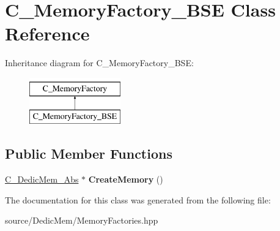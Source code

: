 \hypertarget{class_c___memory_factory___b_s_e}{\section{C\-\_\-\-Memory\-Factory\-\_\-\-B\-S\-E Class Reference}
\label{class_c___memory_factory___b_s_e}
}
Inheritance diagram for C\-\_\-\-Memory\-Factory\-\_\-\-B\-S\-E\-:\begin{figure}[H]
\begin{center}
\leavevmode
\includegraphics[height=2.000000cm]{class_c___memory_factory___b_s_e}
\end{center}
\end{figure}
\subsection*{Public Member Functions}
\begin{DoxyCompactItemize}
\item 
\hypertarget{class_c___memory_factory___b_s_e_a75af4c2fa19fd6ccf7f046c323e005c2}{\hyperlink{class_c___dedic_mem___abs}{C\-\_\-\-Dedic\-Mem\-\_\-\-Abs} $\ast$ {\bfseries Create\-Memory} ()}\label{class_c___memory_factory___b_s_e_a75af4c2fa19fd6ccf7f046c323e005c2}

\end{DoxyCompactItemize}


The documentation for this class was generated from the following file\-:\begin{DoxyCompactItemize}
\item 
source/\-Dedic\-Mem/Memory\-Factories.\-hpp\end{DoxyCompactItemize}
